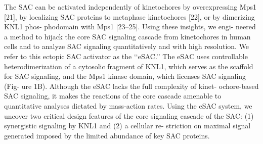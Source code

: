 The SAC can be activated independently of kinetochores by overexpressing Mps1 [21], by localizing SAC proteins to metaphase kinetochores [22], or by dimerizing KNL1 phos- phodomain with Mps1 [23–25]. Using these insights, we engi- neered a method to hijack the core SAC signaling cascade from kinetochores in human cells and to analyze SAC signaling quantitatively and with high resolution. We refer to this ectopic SAC activator as the ‘‘eSAC.’’ The eSAC uses controllable heterodimerization of a cytosolic fragment of KNL1, which serves as the scaffold for SAC signaling, and the Mps1 kinase domain, which licenses SAC signaling (Fig- ure 1B). Although the eSAC lacks the full complexity of kinet- ochore-based SAC signaling, it makes the reactions of the core cascade amenable to quantitative analyses dictated by mass-action rates. Using the eSAC system, we uncover two critical design features of the core signaling cascade of the SAC: (1) synergistic signaling by KNL1 and (2) a cellular re- striction on maximal signal generated imposed by the limited abundance of key SAC proteins.